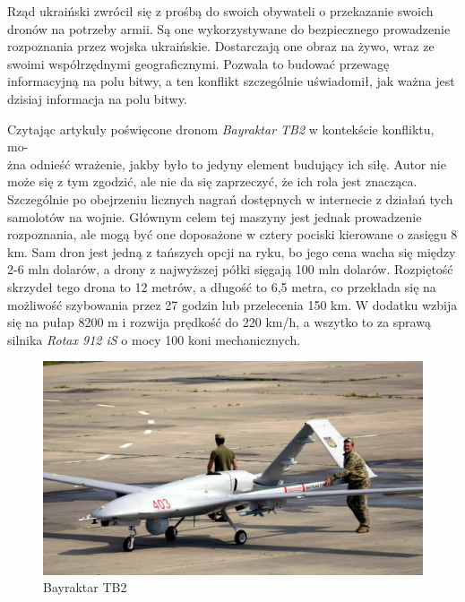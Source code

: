 Rząd ukraiński zwrócił się z prośbą do swoich obywateli o przekazanie swoich dronów na potrzeby armii. Są one wykorzystywane do bezpiecznego prowadzenie rozpoznania przez wojska ukraińskie. Dostarczają one obraz na żywo, wraz ze swoimi współrzędnymi geograficznymi. Pozwala to budować przewagę informacyjną na polu bitwy, a ten konflikt szczególnie uświadomił, jak ważna jest dzisiaj informacja na polu bitwy.\cite{fotografia-drony-ukraina}

Czytając artykuły poświęcone dronom \textit{Bayraktar TB2} w kontekście konfliktu, mo-\\żna odnieść wrażenie, jakby było to jedyny element budujący ich siłę. Autor nie może się z tym zgodzić, ale nie da się zaprzeczyć, że ich rola jest znacząca. Szczególnie po obejrzeniu licznych nagrań dostępnych w internecie z działań tych samolotów na wojnie. Głównym celem tej maszyny jest jednak prowadzenie rozpoznania, ale mogą być one doposażone w cztery pociski kierowane o zasięgu 8 km. Sam dron jest jedną z tańszych opcji na ryku, bo jego cena wacha się między 2-6 mln dolarów, a drony z najwyższej półki sięgają 100 mln dolarów. Rozpiętość skrzydeł tego drona to 12 metrów, a długość to 6,5 metra, co przekłada się na możliwość szybowania przez 27 godzin lub przelecenia 150 km. W dodatku wzbija się na pułap 8200 m i rozwija prędkość do 220 km/h, a wszytko to za sprawą silnika \textit{Rotax 912 iS} o mocy 100 koni mechanicznych.\cite{bayraktar-chip}\cite{bayraktar-pap}

\begin{figure}[!ht]
\begin{center}
  \includegraphics[width=12cm]{./Obrazy/Bayraktar_TB2_ukraina.jpg}
  \caption{Bayraktar TB2}
\end{center}
\end{figure}



